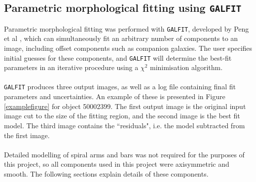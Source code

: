 \documentclass[11pt,twocolumn]{article}
\begin{document}
\subsection{\normalsize Parametric morphological fitting using {\tt GALFIT}}
Parametric morphological fitting was performed with {\tt GALFIT}, developed by Peng et al \cite{Peng:2002ua} \cite{Peng:2009fu}, which can simultaneously fit an arbitrary number of components to an image, including offset components such as companion galaxies. The user specifies initial guesses for these components, and {\tt GALFIT} will determine the best-fit parameters in an iterative procedure using a $\chi^2$ minimisation algorithm. 
\paragraph{} {\tt GALFIT} produces three output images, as well as a log file containing final fit parameters and uncertainties. An example of these is presented in Figure \ref{examplefigure} for object 50002399. The first output image is the original input image cut to the size of the fitting region, and the second image is the best fit model. The third image contains the ``residuals", i.e. the model subtracted from the first image. 
\paragraph{} Detailed modelling of spiral arms and bars was not required for the purposes of this project, so all components used in this project were axisymmetric and smooth. The following sections explain details of these components. 
\end{document}
